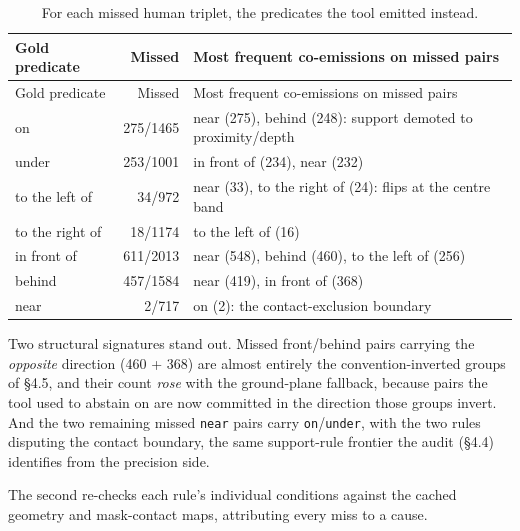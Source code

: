 \begin{center}
\setlength{\tabcolsep}{3pt}
\footnotesize
\begin{longtable}{lrl}
\caption[For each missed human triplet, the predicates the tool]{For each missed human triplet, the predicates the tool emitted instead.}\\
\hline
Gold predicate & Missed & Most frequent co-emissions on missed pairs \\
\hline
\endfirsthead
\hline
Gold predicate & Missed & Most frequent co-emissions on missed pairs \\
\hline
\endhead
on & 275/1465 & near (275), behind (248): support demoted to proximity/depth \\
under & 253/1001 & in front of (234), near (232) \\
to the left of & 34/972 & near (33), to the right of (24): flips at the centre band \\
to the right of & 18/1174 & to the left of (16) \\
in front of & 611/2013 & near (548), behind (460), to the left of (256) \\
behind & 457/1584 & near (419), in front of (368) \\
near & 2/717 & on (2): the contact-exclusion boundary \\
\hline
\end{longtable}
\end{center}

Two structural signatures stand out. Missed front/behind pairs carrying the \textit{opposite} direction (460 + 368) are almost entirely the convention-inverted groups of \S{}4.5, and their count \textit{rose} with the ground-plane fallback, because pairs the tool used to abstain on are now committed in the direction those groups invert. And the two remaining missed \texttt{near} pairs carry \texttt{on}/\texttt{under}, with the two rules disputing the contact boundary, the same support-rule frontier the audit (\S{}4.4) identifies from the precision side.

The second re-checks each rule's individual conditions against the cached geometry and mask-contact maps, attributing every miss to a cause.

